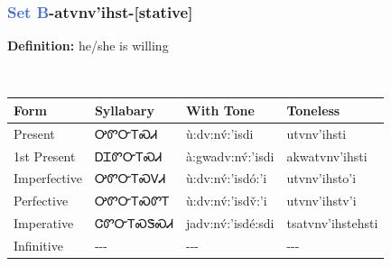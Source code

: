 \subsubsection*{\textcolor{RoyalBlue}{Set B}{-}\textbf{atvnv'ihst}{-}[stative]}
\nopagebreak
\textbf{Definition: } he/she is willing
\\[0.5em]
\begin{tabularx}{\textwidth}{l X X X}%
\toprule%
\textbf{Form}&\textbf{Syllabary}&\textbf{With Tone}&\textbf{Toneless}\\%
\midrule%
Present&ᎤᏛᏅᎢᏍᏗ&ù:dv:nv́:’isdi&utvnv'ihsti\\%
1st Present&ᎠᏆᏛᏅᎢᏍᏗ&à:gwadv:nv́:’isdi&akwatvnv'ihsti\\%
Imperfective&ᎤᏛᏅᎢᏍᏙᏗ&ù:dv:nv́:’isdó:’i&utvnv'ihsto'i\\%
Perfective&ᎤᏛᏅᎢᏍᏛᎢ&ù:dv:nv́:’isdv̌:’i&utvnv'ihstv'i\\%
Imperative&ᏣᏛᏅᎢᏍᏕᏍᏗ&jadv:nv́:’isdé:sdi&tsatvnv'ihstehsti\\%
Infinitive&{-}{-}{-}&{-}{-}{-}&{-}{-}{-}\\%
\bottomrule%
\end{tabularx}
\\[1em]